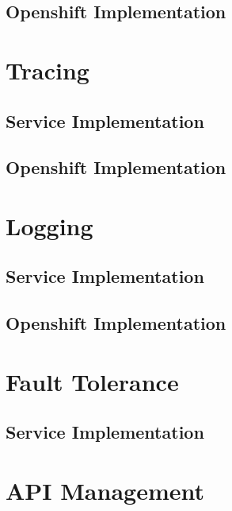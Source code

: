 \subsection{Openshift Implementation}
\label{sec:esbi-config-openshift}

\section{Tracing}
\label{sec:esbi-tracing}

\subsection{Service Implementation}
\label{sec:esbi-tracing-service}

\subsection{Openshift Implementation}
\label{sec:esbi-tracing-openshift}

\section{Logging}
\label{sec:esbi-logging}

\subsection{Service Implementation}
\label{sec:esbi-logging-service}

\subsection{Openshift Implementation}
\label{sec:esbi-logging-openshift}

\section{Fault Tolerance}
\label{sec:esbi-fault}

\subsection{Service Implementation}
\label{sec:esbi-fault-service}

\section{API Management}
\label{sec:esbi-api}

